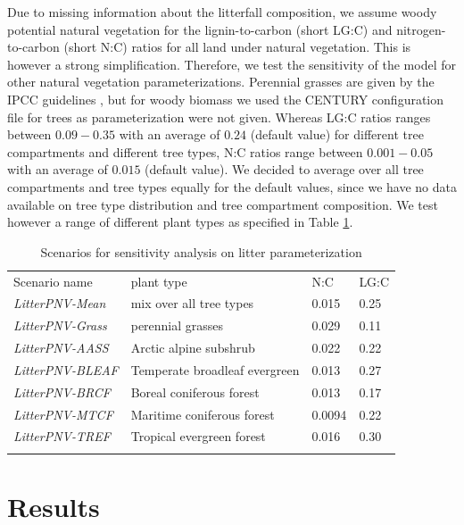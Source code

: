 \documentclass[gc, manuscript]{copernicus}
\begin{document}
Due to missing information about the litterfall composition, we assume woody potential natural vegetation for the lignin-to-carbon (short LG:C) and nitrogen-to-carbon (short N:C) ratios for all land under natural vegetation. This is however a strong simplification. Therefore, we test the sensitivity of the model for other natural vegetation parameterizations. Perennial grasses are given by the IPCC guidelines \citep{calvo_buendia_ipcc_2019}, but for woody biomass we used the CENTURY configuration file \citep{century_model_2000} for trees as parameterization were not given. Whereas LG:C ratios ranges between \(0.09-0.35\) with an average of \(0.24\) (default value) for different tree compartments and different tree types, N:C ratios range between \(0.001-0.05\) with an average of \(0.015\) (default value). We decided to average over all tree compartments and tree types equally for the default values, since we have no data available on tree type distribution and tree compartment composition. We test however a range of different plant types as specified in Table \ref{tab:scenlitterpnv}.

 \begin{table}[h]
 \caption{Scenarios for sensitivity analysis on litter parameterization}
 \begin{tabular}{l l l l}
 \tophline
  Scenario name & plant type & N:C & LG:C \\
  \middlehline
  \textit{LitterPNV-Mean} & mix over all tree types & 0.015  & 0.25 \\
  \textit{LitterPNV-Grass} & perennial grasses     & 0.029  & 0.11 \\
  \textit{LitterPNV-AASS}  & Arctic alpine subshrub           & 0.022  & 0.22 \\
  \textit{LitterPNV-BLEAF} & Temperate broadleaf evergreen    & 0.013  & 0.27 \\
  \textit{LitterPNV-BRCF}  & Boreal coniferous forest         & 0.013  & 0.17 \\
  \textit{LitterPNV-MTCF}  & Maritime coniferous forest       & 0.0094 & 0.22 \\
  \textit{LitterPNV-TREF}  & Tropical evergreen forest        & 0.016  & 0.30 \\
 \bottomhline
 \end{tabular}
 \belowtable{}
 \label{tab:scenlitterpnv}
 \end{table}

\newpage

\hypertarget{results}{%
\section{Results}\label{results}}
\end{document}
